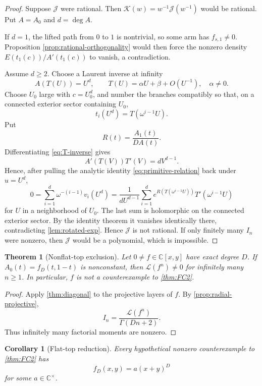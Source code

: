 \documentclass[11pt]{article}
\numberwithin{equation}{section}
\newtheorem{theorem}{Theorem}[section]
\newtheorem{corollary}[corollary]{Corollary}
\theoremstyle{definition}
\theoremstyle{remark}
\newcommand{\C}{\mathbb C}
\newcommand{\Lfac}{\mathcal L}
\newcommand{\Jcal}{\mathcal J}
\newcommand{\Kcal}{\mathcal K}
\begin{document}
\begin{proof}
Suppose $\Jcal$ were rational.  Then $\Kcal(w)=w^{-1}\Jcal(w^{-1})$ would be rational.  Put $A=A_0$ and $d=\deg A$.

If $d=1$, the lifted path from $0$ to $1$ is nontrivial, so some arm has $f_{s,1}\neq0$.  Proposition \ref{prop:rational-orthogonality} would then force the nonzero density $E(t_1(c))/A'(t_1(c))$ to vanish, a contradiction.

Assume $d\ge2$.  Choose a Laurent inverse at infinity
\begin{equation}\label{eq:T-inverse}
  A(T(U))=U^d,
  \qquad
  T(U)=\alpha U+\beta+O(U^{-1}),
  \quad\alpha\neq0.
\end{equation}
Choose $U_0$ large with $c=U_0^d$, and number the branches compatibly so
that, on a connected exterior sector containing $U_0$,
\[
  t_i(U^d)=T(\omega^{i-1}U).
\]
Put
\[
  R(t)=\frac{A_1(t)}{DA(t)}.
\]
Differentiating \eqref{eq:T-inverse} gives
\[
  A'(T(V))T'(V)=dV^{d-1}.
\]
Hence, after pulling the analytic identity
\eqref{eq:primitive-relation} back under $u=U^d$,
\[
  0=\sum_{i=1}^d\omega^{-(i-1)}v_i(U^d)
   =\frac1{dU^{d-1}}
    \sum_{i=1}^d
    e^{R(T(\omega^{i-1}U))}T'(\omega^{i-1}U)
\]
for $U$ in a neighborhood of $U_0$.  The last sum is holomorphic on the
connected exterior sector.  By the identity theorem it vanishes identically
there, contradicting \cref{lem:rotated-exp}.  Hence $\Jcal$ is not rational.
If only finitely many $I_n$ were nonzero, then $\Jcal$ would be a polynomial,
which is impossible.
\end{proof}


\begin{theorem}[Nonflat-top exclusion]\label{thm:nonflat-exclusion}
Let $0\neq f\in\C[x,y]$ have exact degree $D$.  If
$A_0(t)=f_D(t,1-t)$ is nonconstant, then $\Lfac(f^n)\neq0$ for infinitely
many $n\ge1$.  In particular, $f$ is not a counterexample to
\cref{thm:FC2}.
\end{theorem}

\begin{proof}
Apply \cref{thm:diagonal} to the projective layers of $f$.  By
\cref{prop:radial-projective},
\[
  I_n=\frac{\Lfac(f^n)}{\Gamma(Dn+2)}.
\]
Thus infinitely many factorial moments are nonzero.
\end{proof}

\begin{corollary}[Flat-top reduction]\label{cor:flat-top-reduction}
Every hypothetical nonzero counterexample to \cref{thm:FC2} has
\[
  f_D(x,y)=a(x+y)^D
\]
for some $a\in\C^\times$.
\end{corollary}
\end{document}
